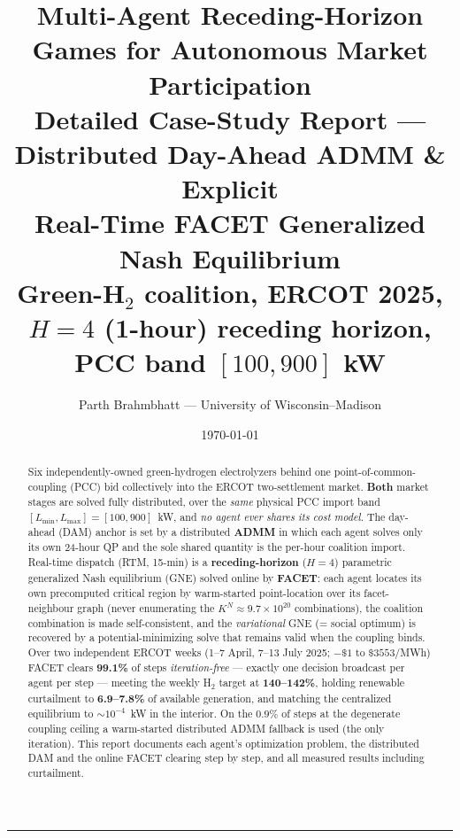 \documentclass[11pt, letterpaper]{article}
\title{\textbf{Multi-Agent Receding-Horizon Games for Autonomous Market Participation}\\[4pt]
\large Detailed Case-Study Report --- Distributed Day-Ahead ADMM \& Explicit\\
Real-Time FACET Generalized Nash Equilibrium\\
\normalsize Green-H$_2$ coalition, ERCOT 2025, $H=4$ (1-hour) receding horizon, PCC band $[100,900]$ kW}
\author{Parth Brahmbhatt --- University of Wisconsin--Madison}
\date{\today}
\begin{document}
\maketitle
\tableofcontents
\bigskip\hrule\bigskip

\begin{abstract}
Six independently-owned green-hydrogen electrolyzers behind one point-of-common-coupling (PCC) bid
collectively into the ERCOT two-settlement market. \textbf{Both} market stages are solved fully
distributed, over the \emph{same} physical PCC import band $[L_{\min},L_{\max}]=[100,900]$~kW, and
\emph{no agent ever shares its cost model}. The day-ahead (DAM) anchor is set by a distributed
\textbf{ADMM} in which each agent solves only its own 24-hour QP and the sole shared quantity is
the per-hour coalition import. Real-time dispatch (RTM, 15-min) is a \textbf{receding-horizon}
($H=4$) parametric generalized Nash equilibrium (GNE) solved online by \textbf{FACET}: each agent
locates its own precomputed critical region by warm-started point-location over its facet-neighbour
graph (never enumerating the $K^N\!\approx\!9.7\times10^{20}$ combinations), the coalition combination
is made self-consistent, and the \emph{variational} GNE (= social optimum) is recovered by a
potential-minimizing solve that remains valid when the coupling binds. Over two independent ERCOT
weeks (1--7 April, 7--13 July 2025; $-\$1$ to $\$3553$/MWh) FACET clears \textbf{99.1\%} of steps
\emph{iteration-free} --- exactly one decision broadcast per agent per step --- meeting the weekly
H$_2$ target at \textbf{140--142\%}, holding renewable curtailment to \textbf{6.9--7.8\%} of available
generation, and matching the centralized equilibrium to $\sim\!10^{-4}$~kW in the interior. On the
$0.9\%$ of steps at the degenerate coupling ceiling a warm-started distributed ADMM fallback is used
(the only iteration). This report documents each agent's optimization problem, the distributed DAM
and the online FACET clearing step by step, and all measured results including curtailment.
\end{abstract}
\end{document}
